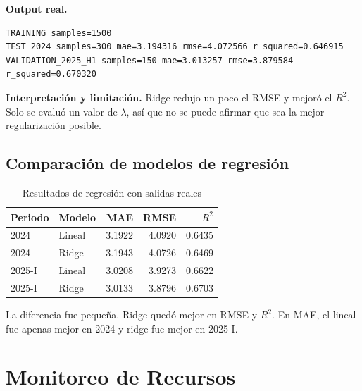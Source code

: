 \documentclass[10pt,a4paper]{article}
\theoremstyle{definition}
\begin{document}
\textbf{Output real.}
\begin{lstlisting}[style=resultado]
TRAINING samples=1500
TEST_2024 samples=300 mae=3.194316 rmse=4.072566 r_squared=0.646915
VALIDATION_2025_H1 samples=150 mae=3.013257 rmse=3.879584 r_squared=0.670320
\end{lstlisting}
\textbf{Interpretación y limitación.} Ridge redujo un poco el RMSE y mejoró el
$R^2$. Solo se evaluó un valor de $\lambda$, así que no se puede afirmar que
sea la mejor regularización posible.

\subsection{Comparación de modelos de regresión}
\begin{table}[H]
\centering\small
\caption{Resultados de regresión con salidas reales}
\begin{tabular}{llrrr}
\toprule
Periodo & Modelo & MAE & RMSE & $R^2$ \\
\midrule
2024 & Lineal & 3.1922 & 4.0920 & 0.6435 \\
2024 & Ridge & 3.1943 & 4.0726 & 0.6469 \\
2025-I & Lineal & 3.0208 & 3.9273 & 0.6622 \\
2025-I & Ridge & 3.0133 & 3.8796 & 0.6703 \\
\bottomrule
\end{tabular}
\end{table}
La diferencia fue pequeña. Ridge quedó mejor en RMSE y $R^2$. En MAE, el
lineal fue apenas mejor en 2024 y ridge fue mejor en 2025-I.

\section{Monitoreo de Recursos}
\end{document}
